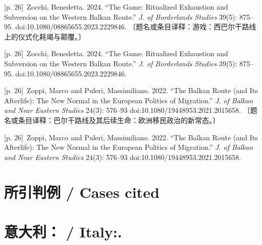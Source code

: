 \documentclass[10pt,a4paper]{article}
\begin{document}
\noindent\begin{minipage}{\textwidth}\begin{minipage}[t]{\dimexpr.5\textwidth-4mm\relax}{\scriptsize\color{gray} [p. 26]}\ Zocchi, Benedetta. 2024. “The Game: Ritualized Exhaustion and Subversion on the Western Balkan Route.” \textit{J. of Borderlands Studies} 39(5): 875–95. doi:10.1080/08865655.2023.2229846. 〔题名或条目译释：游戏：西巴尔干路线上的仪式化耗竭与颠覆。〕\par\end{minipage}\hfill\begin{minipage}[t]{\dimexpr.5\textwidth-4mm\relax}{\scriptsize\color{gray} [p. 26]}\ Zocchi, Benedetta. 2024. “The Game: Ritualized Exhaustion and Subversion on the Western Balkan Route.” \textit{J. of Borderlands Studies} 39(5): 875–95. doi:10.1080/08865655.2023.2229846.\par\end{minipage}\end{minipage}\par
\noindent\begin{minipage}{\textwidth}\begin{minipage}[t]{\dimexpr.5\textwidth-4mm\relax}{\scriptsize\color{gray} [p. 26]}\ Zoppi, Marco and Puleri, Massimiliano. 2022. “The Balkan Route (and Its Afterlife): The New Normal in the European Politics of Migration.” \textit{J. of Balkan and Near Eastern Studies} 24(3): 576–93 doi:10.1080/19448953.2021.2015658. 〔题名或条目译释：巴尔干路线及其后续生命：欧洲移民政治的新常态。〕\par\end{minipage}\hfill\begin{minipage}[t]{\dimexpr.5\textwidth-4mm\relax}{\scriptsize\color{gray} [p. 26]}\ Zoppi, Marco and Puleri, Massimiliano. 2022. “The Balkan Route (and Its Afterlife): The New Normal in the European Politics of Migration.” \textit{J. of Balkan and Near Eastern Studies} 24(3): 576–93 doi:10.1080/19448953.2021.2015658.\par\end{minipage}\end{minipage}\par
{}\section*{所引判例 / Cases cited}
\section*{意大利： / Italy:.}
\end{document}
